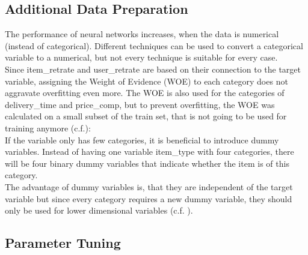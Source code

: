 \documentclass[a4paper,12pt]{article}
\begin{document}
\subsection{Additional Data Preparation}\label{Subsec::AddPrep}
The performance of neural networks increases, when the data is numerical (instead of categorical). Different techniques can be used to convert a categorical variable to a numerical, but not every technique is suitable for every case.\\
Since item\_retrate and user\_retrate are based on their connection to the target variable, assigning the Weight of Evidence (WOE) to each category does not aggravate overfitting even more. The WOE is also used for the categories of delivery\_time and price\_comp, but to prevent overfitting, the WOE was calculated on a small subset of the train set, that is not going to be used for training anymore (c.f.\cite{moeyersoms2015}):\\
If the variable only has few categories, it is beneficial to introduce dummy variables. Instead of having one variable item\_type with four categories, there will be four binary dummy variables that indicate whether the item is of this category. 
\\
The advantage of dummy variables is, that they are independent of the target variable but since every category requires a new dummy variable, they should only be used for lower dimensional variables (c.f. \cite{moeyersoms2015}).

\subsection{Parameter Tuning}
\end{document}

